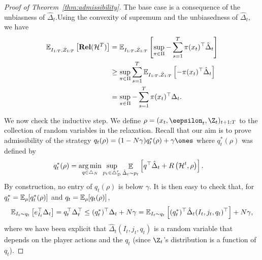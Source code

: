 \documentclass{article}
\newcommand{\exop}{\mathop{\ex}}
\newcommand{\rel}{\mathbf{Rel}}
\newcommand{\hist}{{\mathcal H}}
\begin{document}
\begin{proof}[Proof of Theorem~\ref{thm:admissibility}]
  The base case is a consequence of the unbiasness of $\hat\Delta_t$.Using the convexity of supremum and the unbiasedness of $\hat\Delta_t$, we have 
  \begin{align*}
  \ex_{I_{1:T},\hat Z_{1:T}}\left[
  \rel(\hist^T)
  \right]
  &=
    \ex_{I_{1:T},\hat Z_{1:T}}\left[
    \sup_{\pi\in\Pi}
    -\sum_{s=1}^T \pi(x_t)^\top \hat \Delta_t
    \right]\\
  &\geq
    \sup_{\pi\in\Pi}
    \sum_{s=1}^T
    \ex_{I_{1:T},\hat Z_{1:T}}\left[
    - \pi(x_t)^\top \hat \Delta_t
    \right]\\
  &=
    \sup_{\pi\in\Pi}
    -\sum_{s=1}^T \pi(x_t)^\top \Delta_t.
  \end{align*}

  We now check the inductive step. We define $\rho = (x_t,\eepsilon_t,\Z_t)_{t+1:T}$ to the collection of random variables in the relaxation. Recall that our aim is to prove admissibility of the strategy $q_t(\rho) = (1-N\gamma)q_t^*(\rho)+ \gamma \ones$ where $q_t^*(\rho)$ was defined by
  \begin{align*}
  q_t^*(\rho)
  &=
  \argmin_{q \in \triangle_{N}}
  \sup_{p_t \in \triangle_{\mathcal D}'} 
    \exop_{\hat\Delta_t \sim p_t}\left[
    q^\top\hat\Delta_t
    + R\left(\hist^{t},\rho\right)
    \right].
\end{align*}
By construction, no entry of $q_t(\rho)$ is below $\gamma$. It is then easy to check that, for $q_t^* = \mathbb E_{\rho}[q_t^*(\rho)]$ and $q_t = \mathbb E_{\rho}[q_t(\rho)]$,
\begin{align*}
  \mathbb E_{I_t \sim q_t}\left[ e_{I_t}^\top \Delta_t \right] = q_t^\top \Delta_t^\top 
  \leq (q_t^*)^\top \Delta_t + N\gamma
  =  
  \mathbb E_{I_t\sim q_t} \left[(q_t^*)^\top \hat\Delta_t(I_t,j_t,q_t)^\top \right] + N\gamma,
\end{align*}
where we have been explicit that $\hat\Delta_t(I_t,j_t,q_t)$ is a random variable that depends on the player actions and the $q_t$ (since $\Z_t$'s distribution is a function of $q_t$). 


\end{proof}
\end{document}
